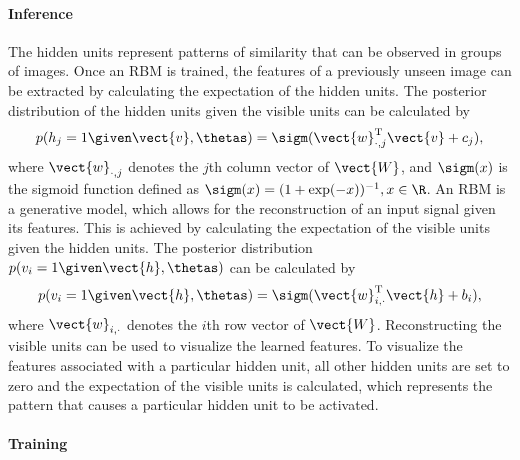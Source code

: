 \paragraph{Inference}
The hidden units represent patterns of similarity that can be observed in groups
of images. Once an RBM is trained, the features of a previously unseen image can
be extracted by calculating the expectation of the hidden units. The posterior
distribution of the hidden units given the visible units can be calculated by
\begin{equation}
\label{eq:dhgivenv}
p(h_j = 1 \given \vect{v}, \thetas) = \sigm(\vect{w}_{\cdot,j}^\text{T}\vect{v}
+ c_j),
\end{equation}
where $\vect{w}_{\cdot,j}$ denotes the $j$th column vector of $\vect{W}$, and
$\sigm(x)$ is the sigmoid function defined as $\sigm(x) = (1+ \exp(-x))^{-1}, x
\in \R$. An RBM is a generative model, which allows for the reconstruction of
an input signal given its features. This is achieved by calculating the expectation
of the visible units given the hidden units. The posterior distribution $p(v_i =
1 \given \vect{h}, \thetas)$ can be calculated by
\begin{equation}
\label{eq:dvgivenh}
p(v_i = 1 \given \vect{h}, \thetas) = \sigm(\vect{w}_{i,
\cdot}^\text{T}\vect{h} + b_i),
\end{equation}
where $\vect{w}_{i,\cdot}$ denotes the $i$th row vector of $\vect{W}$.
Reconstructing the visible units can be used to visualize the learned features.
To visualize the features associated with a particular hidden unit, all other
hidden units are set to zero and the expectation of the visible units is
calculated, which represents the pattern that causes a particular hidden
unit to be activated.

\paragraph{Training}


